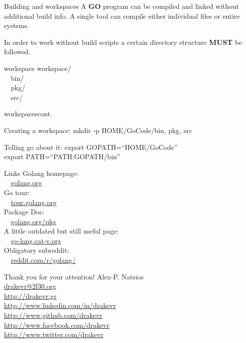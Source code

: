 \documentclass{beamer}
\begin{document}
    \begin{frame}{Building and workspaces}
        A {\bf GO} program can be compiled and linked without additional build info.
        A single tool can compile either individual files or entire systems.

        In order to work without build scripts a certain directory structure
        {\bf MUST} be followed.
        \begin{block}{workspace}
            workspace/\\
            \ \ bin/\\
            \ \ pkg/\\
            \ \ src/\\
        \end{block}
    \end{frame}

    \begin{frame}{workspaces}{cont.}
        \begin{block}{Creating a workspace:}
            mkdir -p \textdollar HOME/GoCode/\textbraceleft bin, pkg, src\textbraceright
        \end{block}

        \begin{block}{Telling go about it:}
            export GOPATH=``\textdollar HOME/GoCode''\\
            export PATH=``\textdollar PATH:\textdollar GOPATH/bin''
        \end{block}
    \end{frame}

    \begin{frame}{Links}
        Golang homepage:\\
        \ \ \url{golang.org}\\
        Go tour:\\
        \ \ \url{tour.golang.org}\\
        Package Doc:\\
        \ \ \url{golang.org/pkg}\\
        A little outdated but still useful page:\\
        \ \ \url{go-lang.cat-v.org}\\
        Obligatory subreddit:\\
        \ \ \url{reddit.com/r/golang/}
    \end{frame}

    \begin{frame}{Thank you for your attention!}
        \center Alex-P. Natsios\\
        \center\url{drakevr@2f30.org}\\
        \center\url{http://drakevr.gr}\\
        \center\url{http://www.linkedin.com/in/drakevr}\\
        \center\url{http://www.github.com/drakevr}\\
        \center\url{http://www.facebook.com/drakevr}\\
        \center\url{http://www.twitter.com/drakevr}
    \end{frame}
\end{document}
